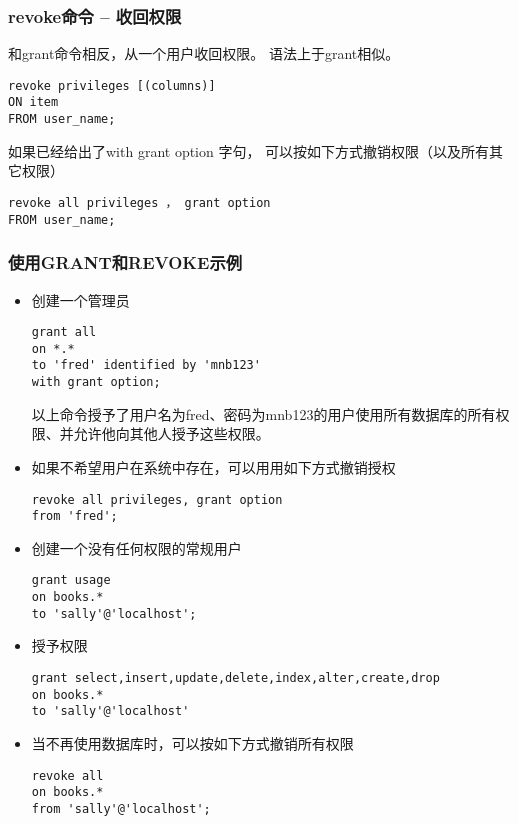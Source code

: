 \documentclass[11pt]{article}
\begin{document}
\subsubsection{revoke命令 -- 收回权限}
\label{sec:org83bfcdd}
和grant命令相反，从一个用户收回权限。 语法上于grant相似。
\begin{verbatim}
revoke privileges [(columns)]
ON item
FROM user_name;
\end{verbatim}
如果已经给出了with grant option 字句， 可以按如下方式撤销权限（以及所有其它权限）
\begin{verbatim}
revoke all privileges ， grant option
FROM user_name;
\end{verbatim}
\subsubsection{使用GRANT和REVOKE示例}
\label{sec:org523e6a0}
\begin{itemize}
\item 创建一个管理员
\begin{verbatim}
grant all
on *.*
to 'fred' identified by 'mnb123'
with grant option;
\end{verbatim}
以上命令授予了用户名为fred、密码为mnb123的用户使用所有数据库的所有权限、并允许他向其他人授予这些权限。
\item 如果不希望用户在系统中存在，可以用用如下方式撤销授权
\begin{verbatim}
revoke all privileges, grant option
from 'fred';
\end{verbatim}
\item 创建一个没有任何权限的常规用户
\begin{verbatim}
grant usage
on books.*
to 'sally'@'localhost';
\end{verbatim}
\item 授予权限
\begin{verbatim}
grant select,insert,update,delete,index,alter,create,drop
on books.*
to 'sally'@'localhost'
\end{verbatim}
\item 当不再使用数据库时，可以按如下方式撤销所有权限
\begin{verbatim}
revoke all
on books.*
from 'sally'@'localhost';
\end{verbatim}
\end{itemize}
\end{document}
